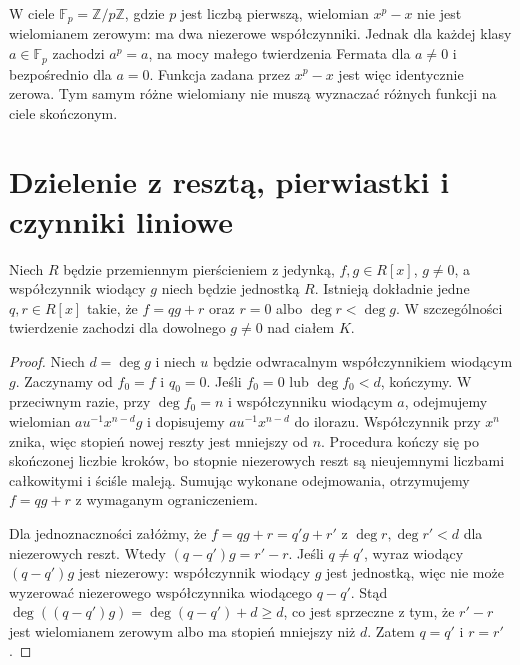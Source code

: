 \begin{przyklad}
\label{aa:prz:poly-finite-field}
W ciele $\mathbb F_p=\mathbb Z/p\mathbb Z$,
gdzie $p$ jest liczbą pierwszą, wielomian $x^p-x$
nie jest wielomianem zerowym: ma dwa niezerowe współczynniki.
Jednak dla każdej klasy $a\in\mathbb F_p$ zachodzi
$a^p=a$, na mocy małego twierdzenia Fermata dla $a\ne0$
i bezpośrednio dla $a=0$. Funkcja zadana przez $x^p-x$
jest więc identycznie zerowa. Tym samym różne wielomiany
nie muszą wyznaczać różnych funkcji na ciele skończonym.
\end{przyklad}



\section{Dzielenie z resztą, pierwiastki i czynniki liniowe}
\begin{twierdzenie}
\label{aa:tw:poly-division}
Niech $R$ będzie przemiennym pierścieniem z jedynką,
$f,g\in R[x]$, $g\ne0$, a współczynnik wiodący $g$
niech będzie jednostką $R$. Istnieją dokładnie jedne
$q,r\in R[x]$ takie, że $f=qg+r$ oraz $r=0$ albo
$\deg r<\deg g$. W szczególności twierdzenie zachodzi
dla dowolnego $g\ne0$ nad ciałem $K$.
\end{twierdzenie}
\begin{proof}
Niech $d=\deg g$ i niech $u$ będzie odwracalnym
współczynnikiem wiodącym $g$.
Zaczynamy od $f_0=f$ i $q_0=0$. Jeśli $f_0=0$
lub $\deg f_0<d$, kończymy. W przeciwnym razie,
przy $\deg f_0=n$ i współczynniku wiodącym $a$,
odejmujemy wielomian $au^{-1}x^{n-d}g$ i dopisujemy
$au^{-1}x^{n-d}$ do ilorazu. Współczynnik przy
$x^n$ znika, więc stopień nowej reszty jest mniejszy
od $n$. Procedura kończy się po skończonej liczbie kroków,
bo stopnie niezerowych reszt są nieujemnymi liczbami całkowitymi
i ściśle maleją. Sumując wykonane odejmowania,
otrzymujemy $f=qg+r$ z wymaganym ograniczeniem.

Dla jednoznaczności załóżmy, że
$f=qg+r=q'g+r'$ z $\deg r,\deg r'<d$ dla niezerowych
reszt. Wtedy $(q-q')g=r'-r$. Jeśli $q\ne q'$,
wyraz wiodący $(q-q')g$ jest niezerowy: współczynnik
wiodący $g$ jest jednostką, więc nie może wyzerować
niezerowego współczynnika wiodącego $q-q'$.
Stąd $\deg((q-q')g)=\deg(q-q')+d\ge d$,
co jest sprzeczne z tym, że $r'-r$ jest wielomianem
zerowym albo ma stopień mniejszy niż $d$. Zatem
$q=q'$ i $r=r'$. 
\end{proof}

